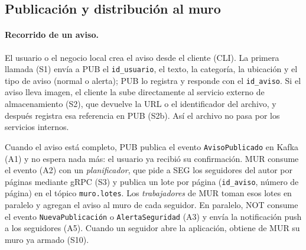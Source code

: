 
\subsection{Publicación y distribución al muro}

\paragraph{Recorrido de un aviso.}
El usuario o el negocio local crea el aviso desde el cliente (CLI). La primera llamada
(S1) envía a PUB el \texttt{id\_usuario}, el texto, la categoría, la ubicación y el tipo
de aviso (normal o alerta); PUB lo registra y responde con el \texttt{id\_aviso}. Si el
aviso lleva imagen, el cliente la sube directamente al servicio externo de almacenamiento
(S2), que devuelve la URL o el identificador del archivo, y después registra esa
referencia en PUB (S2b). Así el archivo no pasa por los servicios internos.

Cuando el aviso está completo, PUB publica el evento \texttt{AvisoPublicado} en Kafka (A1)
y no espera nada más: el usuario ya recibió su confirmación. MUR consume el evento (A2)
con un \emph{planificador}, que pide a SEG los seguidores del autor por páginas mediante
gRPC (S3) y publica un lote por página (\texttt{id\_aviso}, número de página) en el tópico
\texttt{muro.lotes}. Los \emph{trabajadores} de MUR toman esos lotes en paralelo y agregan
el aviso al muro de cada seguidor. En paralelo, NOT consume el evento
\texttt{NuevaPublicación} o \texttt{AlertaSeguridad} (A3) y envía la notificación push a los
seguidores (A5). Cuando un seguidor abre la aplicación, obtiene de MUR su muro ya armado
(S10).

